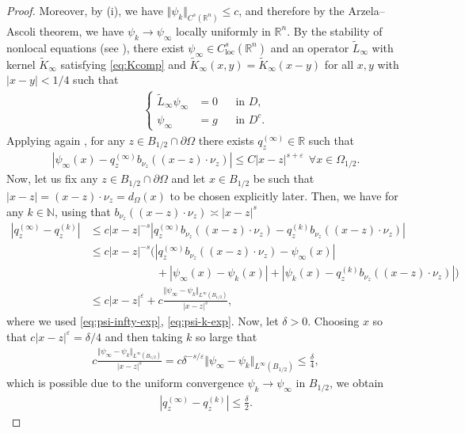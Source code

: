 \documentclass[11pt,reqno]{amsart}
\theoremstyle{plain}
\theoremstyle{definition}
\numberwithin{equation}{section}
\newcommand{\N}{\mathbb{N}}
\newcommand{\R}{\mathbb{R}}
\newcommand{\eps}{\varepsilon}
\newcommand{\1}{\mathbbm{1}}
\begin{document}
\begin{proof}
Moreover, by (i), we have $\Vert \psi_k \Vert_{C^s(\R^n)} \le c$, and therefore by the Arzela--Ascoli theorem, we have $\psi_k \to \psi_{\infty}$ locally uniformly in $\R^n$. By the stability of nonlocal equations (see \cite[Proposition~2.2.36]{FeRo24}), there exist $\psi_{\infty} \in C^s_{\mathrm{loc}}(\R^n)$ and an operator $\widetilde{L}_{\infty}$ with kernel $\widetilde{K}_\infty$ satisfying \eqref{eq:Kcomp} and $\widetilde{K}_\infty(x, y)=\widetilde{K}_\infty(x-y)$ for all $x, y$ with $|x-y|<1/4$ such that
\begin{align*}
\left\{
\begin{aligned}
\widetilde{L}_\infty \psi_\infty &= 0 &&\text{in } D,\\
\psi_\infty &= g &&\text{in } D^c.
\end{aligned}
\right.
\end{align*}
Applying again \cite[Theorem~6.9]{RoWe24}, for any $z \in B_{1/2} \cap \partial \Omega$ there exists $q_z^{(\infty)} \in \R$ such that 
\begin{align}
\label{eq:psi-infty-exp}
|\psi_{\infty}(x) - q^{(\infty)}_z b_{\nu_z}((x-z) \cdot \nu_z)| \le C |x-z|^{s+\eps} ~~ \forall x \in \Omega_{1/2}.
\end{align} 
Now, let us fix any $z \in B_{1/2} \cap \partial \Omega$ and let $x \in B_{1/2}$ be such that $|x-z| = (x-z) \cdot \nu_z = d_{\Omega}(x)$ to be chosen explicitly later. Then, we have for any $k \in \N$, using that $b_{\nu_z}((x-z) \cdot \nu_z) \asymp |x-z|^s$
\begin{align*}
|q_z^{(\infty)} - q_z^{(k)}| &\le c |x-z|^{-s} \left| q_z^{(\infty)} b_{\nu_z}((x-z) \cdot \nu_z) - q_z^{(k)} b_{\nu_z}((x-z) \cdot \nu_z) \right|  \\
&\le c |x-z|^{-s} \Big( |q_z^{(\infty)} b_{\nu_z}((x-z) \cdot \nu_z) - \psi_{\infty}(x)| \\
& \qquad\qquad\qquad + |\psi_{\infty}(x) - \psi_k(x)| + |\psi_k(x) - q_z^{(k)} b_{\nu_z}((x-z) \cdot \nu_z)| \Big) \\
&\le c|x-z|^{\eps} + c \frac{\Vert \psi_{\infty} - \psi_k \Vert_{L^{\infty}(B_{1/2})}}{|x-z|^s},
\end{align*}
where we used \eqref{eq:psi-infty-exp}, \eqref{eq:psi-k-exp}.
Now, let $\delta > 0$. Choosing $x$ so that $c|x-z|^{\eps} = \delta/4$ and then taking $k$ so large that 
\begin{align*}
c \frac{\Vert \psi_{\infty} - \psi_k \Vert_{L^{\infty}(B_{1/2})}}{|x-z|^s} = c \delta^{-s/\eps} \Vert \psi_{\infty} - \psi_k \Vert_{L^{\infty}(B_{1/2})} \le \frac{\delta}{4},
\end{align*}
which is possible due to the uniform convergence $\psi_k \to \psi_{\infty}$ in $B_{1/2}$, we obtain
\begin{align*}
|q_z^{(\infty)} - q_z^{(k)}| \le \frac{\delta}{2}.
\end{align*}


\end{proof}
\end{document}
